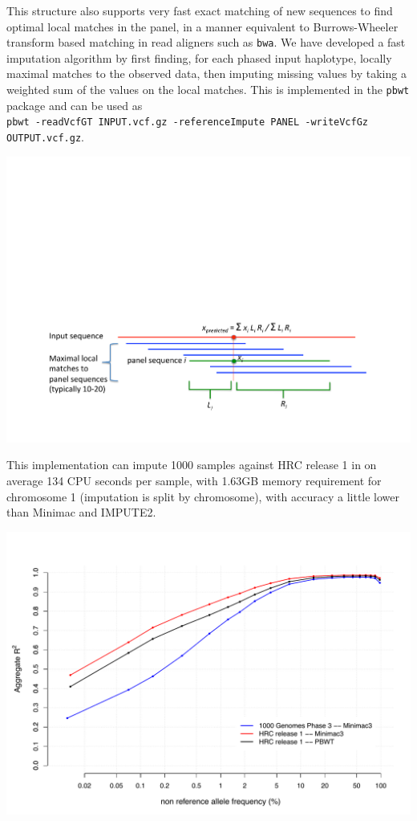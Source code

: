 \documentclass[a0,landscape]{a0poster}
\begin{document}
\begin{multicols}{3}
\noindent This structure also supports very fast exact matching of new sequences to find optimal local matches in the panel, in a manner equivalent to Burrows-Wheeler transform based matching in read aligners such as \texttt{bwa}.  We have developed a fast imputation algorithm by first finding, for each phased input haplotype, locally maximal matches to the observed data, then imputing missing values by taking a weighted sum of the values on the local matches. This is implemented in the \texttt{pbwt} package and can be used as\\
\texttt{pbwt -readVcfGT INPUT.vcf.gz -referenceImpute PANEL -writeVcfGz OUTPUT.vcf.gz}.

\begin{center}\vspace{0.001cm}
\captionsetup{type=figure}
\includegraphics[width=0.6\linewidth]{images/matching.pdf}
\end{center}\vspace{0.001cm}

\noindent This implementation can impute 1000 samples against HRC release 1 in on average 134 CPU seconds per sample, with 1.63GB memory requirement for chromosome 1 (imputation is split by chromosome), with accuracy a little lower than Minimac and IMPUTE2. 

\begin{center}\vspace{0.001cm}
\captionsetup{type=figure}
\includegraphics[width=0.6\linewidth]{images/HRC-G1K-Minimac-PBWT2.pdf}
\end{center}\vspace{0.001cm}


\end{multicols}
\end{document}

